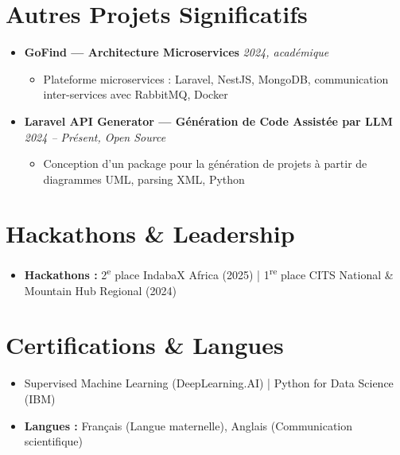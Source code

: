 \documentclass[a4paper,11pt]{article}
\begin{document}
\section{Autres Projets Significatifs}
\begin{itemize}[leftmargin=*, label={}]

    \item \textbf{GoFind — Architecture Microservices} \hfill \textit{2024, académique}
    \vspace{-2pt}
    \begin{itemize}[leftmargin=0.4cm, nosep, label=\tiny$\bullet$]
        \item \small{Plateforme microservices : Laravel, NestJS, MongoDB, communication inter-services avec RabbitMQ, Docker}
    \end{itemize}
    \vspace{2pt}

    \item \textbf{Laravel API Generator — Génération de Code Assistée par LLM} \hfill \textit{2024 -- Présent, Open Source}
    \vspace{-2pt}
    \begin{itemize}[leftmargin=0.4cm, nosep, label=\tiny$\bullet$]
        \item \small{Conception d'un package pour la génération de projets à partir de diagrammes UML, parsing XML, Python}
    \end{itemize}

\end{itemize}

\section{Hackathons \& Leadership}
\begin{itemize}[leftmargin=*, nosep]
    \item \small{\textbf{Hackathons :} 2\textsuperscript{e} place IndabaX Africa (2025) | 1\textsuperscript{re} place CITS National \& Mountain Hub Regional (2024)}
\end{itemize}

\section{Certifications \& Langues}
\begin{itemize}[leftmargin=*, nosep]
    \item \small{Supervised Machine Learning (DeepLearning.AI) | Python for Data Science (IBM)}
    \item \small{\textbf{Langues :} Français (Langue maternelle), Anglais (Communication scientifique)}
\end{itemize}
\end{document}
